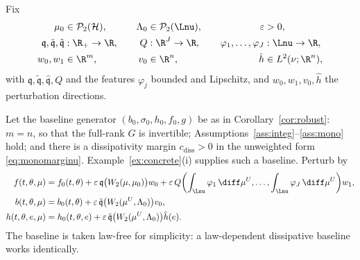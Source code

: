 \begin{example}\label{ex:fulllaw}
Fix
\[
\begin{aligned}
\mu_0&\in\mathcal P_2(\mathcal H), &\quad \Lambda_0&\in\mathcal P_2(\Lnu),
&\quad \varepsilon&>0,\\
\mathfrak q,\tilde{\mathfrak q},\hat{\mathfrak q}&:\R_+\to\R, &\quad Q&:\R^J\to\R,
&\quad \varphi_1,\dots,\varphi_J&:\Lnu\to\R,\\
w_0,w_1&\in\R^m, &\quad v_0&\in\R^n, &\quad \hat h&\in L^2(\nu;\R^n),
\end{aligned}
\]
with $\mathfrak q,\tilde{\mathfrak q},\hat{\mathfrak q},Q$ and the features $\varphi_j$ bounded and Lipschitz, and
$w_0,w_1,v_0,\hat h$ the perturbation directions.

Let the baseline generator $(b_0,\sigma_0,h_0,f_0,g)$ be as in Corollary~\ref{cor:robust}:
$m=n$, so that the full-rank $G$ is invertible; Assumptions~\ref{ass:integ}--\ref{ass:mono}
hold; and there is a dissipativity margin $c_{\mathrm{diss}}>0$ in the unweighted form
\eqref{eq:monomarginu}. Example~\ref{ex:concrete}(i) supplies such a baseline. Perturb by
\begin{align*}
f(t,\theta,\mu)&=f_0(t,\theta)+\varepsilon\,\mathfrak q\bigl(W_2(\mu,\mu_0)\bigr)w_0
+\varepsilon\,Q\biggl(\int_{\Lnu}\varphi_1\,\diff\mu^U,\dots,\int_{\Lnu}\varphi_J\,\diff\mu^U\biggr)w_1,\\
b(t,\theta,\mu)&=b_0(t,\theta)+\varepsilon\,\tilde{\mathfrak q}\bigl(W_2(\mu^U,\Lambda_0)\bigr)v_0,\\
h(t,\theta,e,\mu)&=h_0(t,\theta,e)+\varepsilon\,\hat{\mathfrak q}\bigl(W_2(\mu^U,\Lambda_0)\bigr)\hat h(e) .
\end{align*}
The baseline is taken law-free for simplicity: a law-dependent dissipative baseline
works identically.


\end{example}
